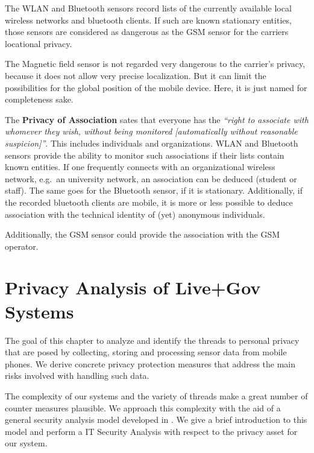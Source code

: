 The WLAN and Bluetooth sensors record lists of the currently available local wireless networks and bluetooth clients.
If such are known stationary entities, those sensors are considered as dangerous as the GSM sensor for the carriers locational privacy.

The Magnetic field sensor is not regarded very dangerous to the carrier's privacy, because it does not allow very precise localization.
But it can limit the possibilities for the global position of the mobile device.
Here, it is just named for completeness sake.

The \textbf{Privacy of Association} sates that everyone has the \emph{``right to associate with whomever they wish, without being monitored [automatically without reasonable suspicion]''}.
This includes individuals and organizations.
WLAN and Bluetooth sensors provide the ability to monitor such associations if their lists contain known entities.
If one frequently connects with an organizational wireless network, e.g.~an university network, an association can be deduced (student or staff). The same goes for the Bluetooth sensor, if it is stationary.
Additionally, if the recorded bluetooth clients are mobile, it is more or less possible to deduce association with the technical identity of (yet) anonymous individuals.

Additionally, the GSM sensor could provide the association with the GSM operator.



\pagebreak

\chapter{Privacy Analysis of Live+Gov Systems}

The goal of this chapter to analyze and identify the threads to personal privacy that are posed by collecting, storing and processing sensor data from mobile phones.
We derive concrete privacy protection measures that address the main risks involved with handling such data.

The complexity of our systems and the variety of threads make a great number of counter measures plausible.
We approach this complexity with the aid of a general security analysis model developed in \cite{Grimm:ItSecRefModel}.
We give a brief introduction to this model and perform a IT Security Analysis with respect to the privacy asset for our system.

